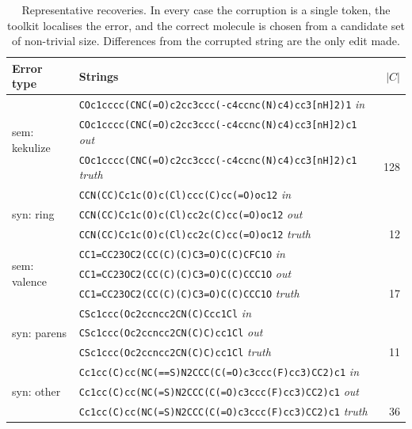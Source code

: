 \begin{table}[t]
\centering\small
\caption{Representative recoveries. In every case the corruption is a single token, the toolkit localises the error, and the correct molecule is chosen from a candidate set of non-trivial size. Differences from the corrupted string are the only edit made.}
\label{tab:examples}
\begin{tabular}{@{}p{2.0cm}p{12.4cm}r@{}}
\toprule
Error type & Strings & $|C|$ \\
\midrule
\multirow{3}{*}{sem: kekulize} & \texttt{\footnotesize COc1cccc(CNC(=O)c2cc3ccc(-c4ccnc(N)c4)cc3[nH]2)1} \hfill\textit{\scriptsize in} \\
 & \texttt{\footnotesize COc1cccc(CNC(=O)c2cc3ccc(-c4ccnc(N)c4)cc3[nH]2)c1} \hfill\textit{\scriptsize out} \\
 & \texttt{\footnotesize COc1cccc(CNC(=O)c2cc3ccc(-c4ccnc(N)c4)cc3[nH]2)c1} \hfill\textit{\scriptsize truth} & 128 \\[2pt]
\multirow{3}{*}{syn: ring} & \texttt{\footnotesize CCN(CC)Cc1c(O)c(Cl)ccc(C)cc(=O)oc12} \hfill\textit{\scriptsize in} \\
 & \texttt{\footnotesize CCN(CC)Cc1c(O)c(Cl)cc2c(C)cc(=O)oc12} \hfill\textit{\scriptsize out} \\
 & \texttt{\footnotesize CCN(CC)Cc1c(O)c(Cl)cc2c(C)cc(=O)oc12} \hfill\textit{\scriptsize truth} & 12 \\[2pt]
\multirow{3}{*}{sem: valence} & \texttt{\footnotesize CC1=CC23OC2(CC(C)(C)C3=O)C(C)CFC1O} \hfill\textit{\scriptsize in} \\
 & \texttt{\footnotesize CC1=CC23OC2(CC(C)(C)C3=O)C(C)CCC1O} \hfill\textit{\scriptsize out} \\
 & \texttt{\footnotesize CC1=CC23OC2(CC(C)(C)C3=O)C(C)CCC1O} \hfill\textit{\scriptsize truth} & 17 \\[2pt]
\multirow{3}{*}{syn: parens} & \texttt{\footnotesize CSc1ccc(Oc2ccncc2CN(C)Ccc1Cl} \hfill\textit{\scriptsize in} \\
 & \texttt{\footnotesize CSc1ccc(Oc2ccncc2CN(C)C)cc1Cl} \hfill\textit{\scriptsize out} \\
 & \texttt{\footnotesize CSc1ccc(Oc2ccncc2CN(C)C)cc1Cl} \hfill\textit{\scriptsize truth} & 11 \\[2pt]
\multirow{3}{*}{syn: other} & \texttt{\footnotesize Cc1cc(C)cc(NC(==S)N2CCC(C(=O)c3ccc(F)cc3)CC2)c1} \hfill\textit{\scriptsize in} \\
 & \texttt{\footnotesize Cc1cc(C)cc(NC(=S)N2CCC(C(=O)c3ccc(F)cc3)CC2)c1} \hfill\textit{\scriptsize out} \\
 & \texttt{\footnotesize Cc1cc(C)cc(NC(=S)N2CCC(C(=O)c3ccc(F)cc3)CC2)c1} \hfill\textit{\scriptsize truth} & 36 \\
\bottomrule
\end{tabular}
\end{table}
